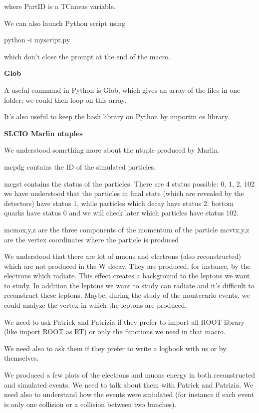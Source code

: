 where PartID is a TCanvas variable.

We can also launch Python script using

python -i myscript.py 

which don't close the prompt at the end of the macro.

\textbf{Glob}

A useful command in Python is Glob, which gives an array of the files in one folder; we could then loop on this array.

It's also useful to keep the bash library on Python by importin os library.

\textbf{SLCIO Marlin ntuples}

We understood something more about the ntuple produced by Marlin. 

mcpdg contains the ID of the simulated particles.

mcgst contains the status of the particles. There are 4 status possible: 0, 1, 2, 102
we have understood that the particles in final state (which are revealed by the detectors) have status 1, while particles which decay have status 2. bottom quarks have status 0 and we will check later which particles have status 102.

mcmox,y,z are the three components of the momentum of the particle
mcvtx,y,z are the vertex coordinates where the particle is produced

We understood that there are lot of muons and electrons (also reconstructed) which are not produced in the W decay. They are produced, for instance, by the electrons which radiate. This effect creates a background to the leptons we want to study.
In addition the leptons we want to study can radiate and it's difficult to reconstruct these leptons. Maybe, during the study of the montecarlo events, we could analyze the vertex in which the leptons are produced.

We need to ask Patrick and Patrizia if they prefer to import all ROOT library (like import ROOT as RT) or only the functions we need in that macro.

We need also to ask them if they prefer to write a logbook with us or by themselves.

We produced a few plots of the electrons and muons energy in both reconstructed and simulated events. We need to talk about them with Patrick and Patrizia. We need also to understand how the events were smiulated (for instance if each event is only one collision or a collision between two bunches).